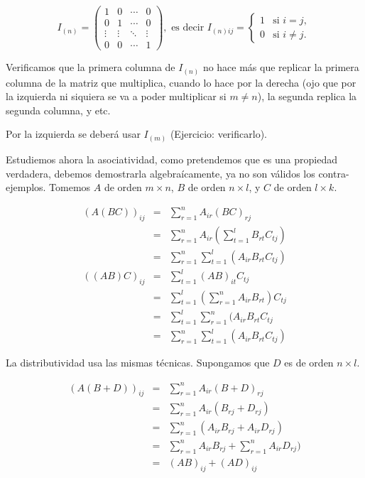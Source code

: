 \documentclass[12pt]{book}
\begin{document}
$$I_{(n)} = \left(\begin{array}{cccc}
1& 0& \cdots &0\\
0& 1& \cdots &0\\
\vdots& \vdots& \ddots & \vdots\\
0& 0& \cdots & 1
\end{array}\right), \textrm{ es decir } I_{(n)ij}=\left\{\begin{array}{rl} 1&\textrm{si }i=j,\\ 0&\textrm{si }i\not=j.\end{array}\right.$$

Verificamos que la primera columna de $I_{(n)}$ no hace más que replicar la primera columna de la matriz que multiplica, cuando lo hace por la derecha (ojo que por la izquierda ni siquiera se va a poder multiplicar si $m\not=n$), la segunda replica la segunda columna, y etc.

Por la izquierda se deberá usar $I_{(m)}$ (Ejercicio: verificarlo).

 

Estudiemos ahora la asociatividad, como pretendemos que es una propiedad verdadera, debemos demostrarla algebraícamente, ya no son válidos los contra-ejemplos.
Tomemos $A$ de orden $m\times n$, $B$ de orden $n\times l$, y $C$ de orden $l\times k$.

\begin{eqnarray*}
  (A(BC))_{ij} &=& \sum_{r=1}^n A_{ir}(BC)_{rj}\\
  &=& \sum_{r=1}^n A_{ir}(\sum_{t=1}^l B_{rt}C_{tj})\\
  &=& \sum_{r=1}^n \sum_{t=1}^l (A_{ir}B_{rt}C_{tj})
\end{eqnarray*}
\begin{eqnarray*}
  ((AB)C)_{ij} &=& \sum_{t=1}^l (AB)_{it}C_{tj}\\
  &=& \sum_{t=1}^l (\sum_{r=1}^n A_{ir}B_{rt}) C_{tj}\\
  &=& \sum_{t=1}^l \sum_{r=1}^n (A_{ir}B_{rt} C_{tj}\\
  &=& \sum_{r=1}^n \sum_{t=1}^l (A_{ir}B_{rt} C_{tj})
\end{eqnarray*}

 

La distributividad usa las mismas técnicas.
Supongamos que $D$ es de orden $n\times l$.

\begin{eqnarray*}
  (A(B+D))_{ij} &=& \sum_{r=1}^n A_{ir}(B+D)_{rj}\\
  &=& \sum_{r=1}^n A_{ir}(B_{rj}+D_{rj})\\
  &=& \sum_{r=1}^n (A_{ir}B_{rj}+ A_{ir}D_{rj})\\
  &=& \sum_{r=1}^n A_{ir}B_{rj}+ \sum_{r=1}^n A_{ir}D_{rj})\\
  &=& (AB)_{ij} + (AD)_{ij}
\end{eqnarray*}
\end{document}
